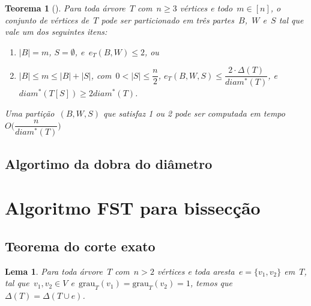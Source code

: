 \documentclass[a4paper,12pt]{article}
\newtheorem{teo}{Teorema}
\newtheorem{lem}{Lema}
\newcommand{\grau}{\mathrm{grau}}
\begin{document}
		\begin{teo}[{\cite[Theorem 4]{Schmidt15}}]
		\label{teo:dobraDiametro}
			Para toda árvore~$T$ com~$n\ge 3$ vértices e 
			todo~$m\in [n]$,
			o conjunto de vértices de~$T$ pode ser particionado em 
			três partes~$B$,~$W$ e~$S$ tal que vale um dos 
			seguintes itens:
			\begin{enumerate}
				\item ${|B|=m}$, ${S=\emptyset}$, e~${e_T(B,W)\le 2}$, ou
				\item ${|B|\le m\le |B|+|S|}$, 
				com~${0<|S|\le\dfrac{n}{2}}$,
				${e_T(B,W,S)\le \dfrac{2\cdot 
				\Delta(T)}{diam^*(T)}}$, 
				e~${diam^*(T[S])\ge 2diam^*(T)}$.
			\end{enumerate}
			Uma partição~$(B,W,S)$ que satisfaz 1 ou 2 pode ser
			computada em tempo~${O\Big(\dfrac{n}{diam^*(T)}\Big)}$ 
		\end{teo}

	\medskip
	\medskip


	\subsection{Algortimo da dobra do diâmetro}
	\begin{algorithm}[H]
	\label{alg:dobraDiametro}

		\caption{}
		\Output{}

	\end{algorithm}	

\newpage
\section {Algoritmo FST para bissecção}

	\subsection{Teorema do corte exato}
	\begin{lem}
	\label{lem:grauMaximo}
		Para toda árvore~$T$ com~$n>2$ vértices
		e toda aresta~${e=\{v_1,v_2\}}$ em~$T$, 
		tal que~$v_1,v_2\in V$ e~${\grau_T(v_1)=\grau_T(v_2)=1}$,
		temos que~${\Delta(T) = \Delta(T\cup e)}$.
	\end{lem}
	
\end{document}
